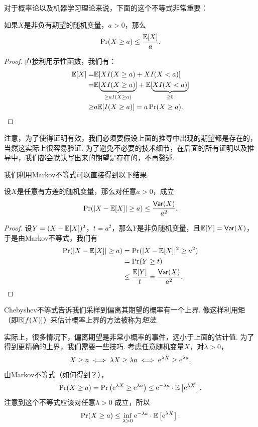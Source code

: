 对于概率论以及机器学习理论来说，下面的这个不等式非常重要：

\begin{theorem}[Markov不等式]\label{thm:markov-inequality}
    如果$X$是非负有期望的随机变量，$a>0$，那么
        \[
            \Pr(X\geq a) \leq \frac{\mathbb{E}[X]}{a}.
        \]
\end{theorem}

\begin{proof}
直接利用示性函数，我们有：
    \begin{align*}
        \mathbb{E}[X] = &\mathbb{E}[X I(X\geq a)+X I(X<a)]\\
        =&\mathbb{E}[\underbrace{X I(X\geq a)}_{\geq aI(X\geq a)}]+\mathbb{E}[\underbrace{XI(X<a)}_{\geq 0}]\\
        \geq& a\mathbb{E}[I(X\geq a)]=a\Pr(X\geq a).
    \end{align*}
\end{proof}

注意，为了使得证明有效，我们必须要假设上面的推导中出现的期望都是存在的，当然这实际上很容易验证. 为了避免不必要的技术细节，在后面的所有证明以及推导中，我们都会默认写出来的期望是存在的，不再赘述. 

我们利用Markov不等式可以直接得到以下结果. 
\begin{corollary}[Chebyshev不等式]\label{cor:chebyshev-inequality}
设$X$是任意有方差的随机变量，那么对任意$a>0$，成立
    \[
        \Pr(|X - \mathbb{E}[X]| \geq a) \leq \frac{\mathsf{Var}(X)}{a^2}.
    \]
\end{corollary}
\begin{proof}
设$Y=(X-\mathbb{E}[X])^2$，$t=a^2$，那么$Y$是非负随机变量，且$\mathbb{E}[Y]=\mathsf{Var}(X)$，于是由Markov不等式，我们有
\begin{align*}
    \Pr(|X - \mathbb{E}[X]| \geq a) &= \Pr(|X - \mathbb{E}[X]|^2 \geq a^2) \\
    &=\Pr(Y \geq t) \\
    &\leq \frac{\mathbb{E}[Y]}{t}=\frac{\mathsf{Var}(X)}{a^2}.
\end{align*}
\end{proof}

Chebyshev不等式告诉我们采样到偏离其期望的概率有一个上界. 像这样利用矩（即$\mathbb{E}[f(X)]$）来估计概率上界的方法被称为\emph{矩法}. 

实际上，很多情况下，偏离期望是非常小概率的事件，远小于上面的估计值. 为了得到更精确的上界，我们需要一些技巧. 考虑任意随机变量$X$，对$\lambda >0$，
\[
X\geq a \iff \lambda X \geq \lambda a \iff \mathrm{e}^{\lambda X} \geq \mathrm{e}^{\lambda a}.
\]
由Markov不等式（如何得到？），
\[
\Pr(X\geq a) = \Pr\left(\mathrm{e}^{\lambda X} \geq \mathrm{e}^{\lambda a}\right) \leq \mathrm{e}^{- \lambda a}\cdot \mathbb{E}\left[\mathrm{e}^{\lambda X}\right]. 
\]
注意到这个不等式应该对任意$\lambda > 0$ 成立，所以
\[
\Pr(X\geq a) \leq \inf_{\lambda >0} \mathrm{e}^{- \lambda a}\cdot \mathbb{E} \left[\mathrm{e}^{\lambda X}\right].
\]

